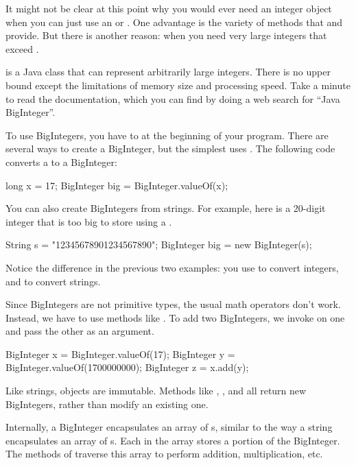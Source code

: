It might not be clear at this point why you would ever need an integer object when you can just use an  or .
One advantage is the variety of methods that  and  provide.
But there is another reason: when you need very large integers that exceed .


 is a Java class that can represent arbitrarily large integers.
There is no upper bound except the limitations of memory size and processing speed.
Take a minute to read the documentation, which you can find by doing a web search for ``Java BigInteger''.


To use BigIntegers, you have to  at the beginning of your program.
There are several ways to create a BigInteger, but the simplest uses .
The following code converts a  to a BigInteger:

\begin{code}
long x = 17;
BigInteger big = BigInteger.valueOf(x);
\end{code}

You can also create BigIntegers from strings.
For example, here is a 20-digit integer that is too big to store using a .

\begin{code}
String s = "12345678901234567890";
BigInteger big = new BigInteger(s);
\end{code}

Notice the difference in the previous two examples: you use  to convert integers, and  to convert strings.

Since BigIntegers are not primitive types, the usual math operators don't work.
Instead, we have to use methods like .
To add two BigIntegers, we invoke  on one and pass the other as an argument.

\begin{code}
BigInteger x = BigInteger.valueOf(17);
BigInteger y = BigInteger.valueOf(1700000000);
BigInteger z = x.add(y);
\end{code}

Like strings,  objects are immutable.
Methods like , , and  all return new BigIntegers, rather than modify an existing one.

Internally, a BigInteger encapsulates an array of s, similar to the way a string encapsulates an array of s.
Each  in the array stores a portion of the BigInteger.
The methods of  traverse this array to perform addition, multiplication, etc.

